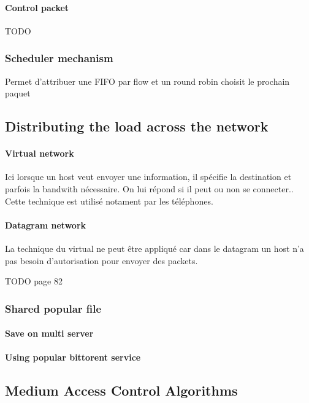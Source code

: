 \documentclass{report}
\begin{document}
\paragraph{Control packet}
TODO

\subsubsection{Scheduler mechanism}
Permet d'attribuer une FIFO par flow et un round robin choisit le prochain paquet


\subsection{Distributing the load across the network}

\paragraph{Virtual network}
Ici lorsque un host veut envoyer une information, il spécifie la destination et parfois la
bandwith nécessaire. On lui répond si il peut ou non se connecter.. Cette technique
est utilisé notament par les téléphones.

\paragraph{Datagram network}
La technique du virtual ne peut être appliqué car dans le datagram un host n'a pas 
besoin d'autorisation pour envoyer des packets.

TODO page 82


\subsubsection{Shared popular file}

\paragraph{Save on multi server}

\paragraph{Using popular bittorent service}


\subsection{Medium Access Control Algorithms}
\end{document}
